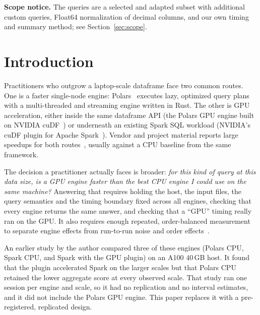 \documentclass[sigconf, nonacm]{acmart}
\begin{document}
\noindent\textbf{Scope notice.} \tpcdisclaimer{} The queries are a selected
and adapted subset with additional custom queries, Float64 normalization of
decimal columns, and our own timing and summary method; see
Section~\ref{sec:scope}.

\section{Introduction}
\label{sec:intro}

Practitioners who outgrow a laptop-scale dataframe face two common routes. One
is a faster single-node engine: Polars~\citep{polars1442} executes lazy,
optimized query plans with a multi-threaded and streaming engine written in
Rust. The other is GPU acceleration, either inside the same dataframe API (the
Polars GPU engine built on NVIDIA cuDF~\citep{polars_gpu_guide,cudf_polars_docs})
or underneath an existing Spark SQL workload (NVIDIA's cuDF plugin for Apache
Spark~\citep{nvidia_cudf_spark_docs}). Vendor and project material reports
large speedups for both routes~\citep{semaan2024polarsgpu,nvidia_spark_benchmarks},
usually against a CPU baseline from the same framework.

The decision a practitioner actually faces is broader: \emph{for this kind of
query at this data size, is a GPU engine faster than the best CPU engine I could
use on the same machine?} Answering that requires holding the host, the input
files, the query semantics and the timing boundary fixed across all engines,
checking that every engine returns the same answer, and checking that a ``GPU''
timing really ran on the GPU. It also requires enough repeated, order-balanced
measurement to separate engine effects from run-to-run noise and order
effects~\citep{mytkowicz2009wrong,kalibera2013rigorous,hoefler2015scientific,raasveldt2018fair}.

An earlier study by the author compared three of these engines (Polars CPU,
Spark CPU, and Spark with the GPU plugin) on an A100 40\,GB host. It found that
the plugin accelerated Spark on the larger scales but that Polars CPU retained
the lower aggregate score at every observed scale. That study ran one session
per engine and scale, so it had no replication and no interval estimates, and
it did not include the Polars GPU engine. This paper replaces it with a
pre-registered, replicated design.
\end{document}
